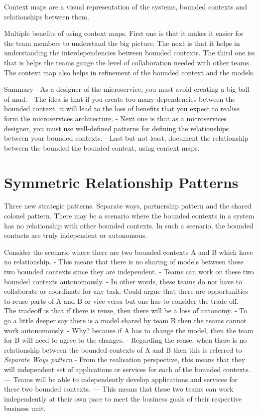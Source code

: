 Context maps are a visual representation of the systems, bounded contexts and relationships between them.

Multiple benefits of using context maps.
First one is that it makes it easier for the team members to understand the big picture.
The next is that it helps in understanding the interdependencies between bounded contexts.
The third one iss that is helps the teams gauge the level of collaboration needed with other teams.
The context map also helps in refinement of the bounded context and the models.

Summary
- As a designer of the microservice, you must avoid creating a big ball of mud.
- The idea is that if you create too many dependencies between the bounded context, it will lead to the loss of benefits that you expect to realise form the microservices architecture.
- Next one is that as a microservices designer, you must use well-defined patterns for defining the relationships between your bounded contexts.
- Last but not least, document the relationship between the bounded the bounded context, using context maps.


\section{Symmetric Relationship Patterns}

Three new strategic patterns.
Separate ways, partnership pattern and the shared colonel pattern.
There may be a scenario where the bounded contexts in a system has no relationship with other bounded contexts.
In such a scenario, the bounded contacts are truly independent or autonomous.

Consider the scenario where there are two bounded contexts A and B which have no relationship.
- This means that there is no sharing of models between these two bounded contexts since they are independent.
- Teams can work on these two bounded contexts autonomously.
- In other words, these teams do not have to collaborate or coordinate for any task.
Could argue that there are opportunities to reuse parts of A and B or vice versa but one has to consider the trade off.
- The tradeoff is that if there is reuse, then there will be a loss of autonomy.
- To go a little deeper say there is a model shared by team B then the teams cannot work autonomously.
- Why? because if A has to change the model, then the team for B will need to agree to the changes.
- Regarding the reuse, when there is no relationship between the bounded contexts of A and B then this is referred to \textit{Separate Ways pattern}
- From the realisation perspective, this means that they will independent set of applications or services for each of the bounded contexts.
--- Teams will be able to independently develop applications and services for these two bounded contexts.
--- This means that these two teams can work independently at their own pace to meet the business goals of their respective business unit.

